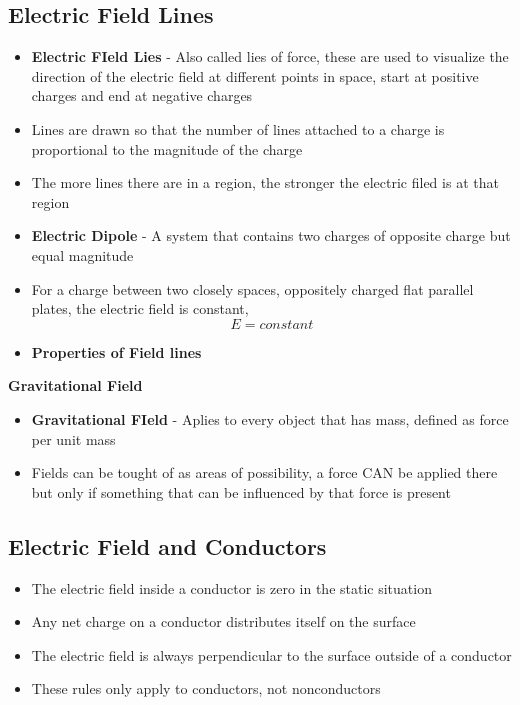 \subsection{Electric Field Lines}
\begin{itemize}
    \item \textbf{Electric FIeld Lies} - Also called lies of force, these are used to visualize the direction of the electric field at different points in space, start at positive charges and end at negative charges
    \item Lines are drawn so that the number of lines attached to a charge is proportional to the magnitude of the charge
    \item The more lines there are in a region, the stronger the electric filed is at that region
    \item \textbf{Electric Dipole} - A system that contains two charges of opposite charge but equal magnitude
    \item For a charge between two closely spaces, oppositely charged flat parallel plates, the electric field is constant, \[E=constant\]
    \item \textbf{Properties of Field lines}
\end{itemize}

\textbf{Gravitational Field}
\begin{itemize}
    \item \textbf{Gravitational FIeld} - Aplies to every object that has mass, defined as force per unit mass
    \item Fields can be tought of as areas of possibility, a force CAN be applied there but only if something that can be influenced by that force is present
\end{itemize}

\subsection{Electric Field and Conductors}
\begin{itemize}
    \item The electric field inside a conductor is zero in the static situation
    \item Any net charge on a conductor distributes itself on the surface
    \item The electric field is always perpendicular to the surface outside of a conductor
    \item These rules only apply to conductors, not nonconductors 
\end{itemize}

